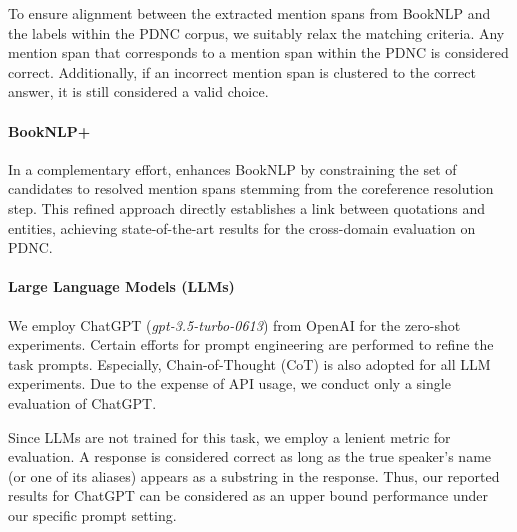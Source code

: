 \documentclass[letterpaper]{article} %
\begin{document}
To ensure alignment between the extracted mention spans from BookNLP and the labels within the PDNC corpus, we suitably relax the matching criteria. Any mention span that corresponds to a mention span within the PDNC is considered correct. Additionally, if an incorrect mention span is clustered to the correct answer, it is still considered a valid choice.

\paragraph{BookNLP+}
In a complementary effort, \citet{DBLP:conf/acl/VishnubhotlaRHH23} enhances BookNLP by constraining the set of candidates to resolved mention spans stemming from the coreference resolution step. This refined approach directly establishes a link between quotations and entities, achieving state-of-the-art results for the cross-domain evaluation on PDNC.

\paragraph{Large Language Models (LLMs)}
We employ ChatGPT (\textit{gpt-3.5-turbo-0613}) from OpenAI for the zero-shot experiments. Certain efforts for prompt engineering are performed to refine the task prompts. Especially, Chain-of-Thought (CoT) \cite{cot} is also adopted for all LLM experiments.
Due to the expense of API usage, we conduct only a single evaluation of ChatGPT.

Since LLMs are not trained for this task, we employ a lenient metric for evaluation. A response is considered correct as long as the true speaker's name (or one of its aliases) appears as a substring in the response. Thus, our reported results for ChatGPT can be considered as an upper bound performance under our specific prompt setting.
\end{document}
